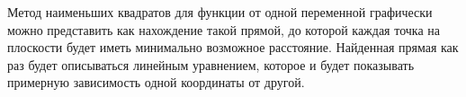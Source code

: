 Метод наименьших квадратов для функции от одной переменной графически можно представить как нахождение такой прямой, до которой каждая точка на плоскости будет иметь минимально возможное расстояние.
Найденная прямая как раз будет описываться линейным уравнением, которое и будет показывать примерную зависимость одной координаты от другой.




